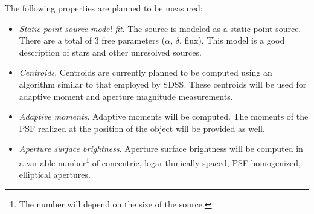 \documentclass[SE,lsstdraft,toc]{lsstdoc}
\begin{document}
The following \Source properties are planned to be measured:
%
\begin{itemize}
    \item \emph{Static point source model fit}. The source is modeled as a static point source. There are a total of 3 free parameters ($\alpha$, $\delta$, flux). This model is a good description of stars and other unresolved sources. 

    \item \emph{Centroids}. Centroids are currently planned to be computed using an algorithm similar to that employed by SDSS. These centroids will be used for adaptive moment and aperture magnitude measurements. 

    \item \emph{Adaptive moments}. Adaptive moments will be computed. The moments of the PSF realized at the position of the object will be provided as well. 


    \item \emph{Aperture surface brightness}. Aperture surface brightness will be computed in a variable number\footnote{The number will depend on the size of the source.} of concentric, logarithmically spaced, PSF-homogenized, elliptical apertures. 


\end{itemize}
\end{document}
